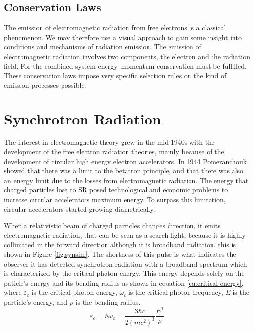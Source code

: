 \subsection{Conservation Laws}
The emission of electromagnetic radiation from free electrons is a classical phenomenon. We may therefore use a visual approach to gain some insight into conditions and mechanisms of radiation emission.
The emission of electromagnetic radiation involves two components, the electron and the radiation field. For the combined system energy–momentum conservation must be fulfilled. These conservation laws impose very specific selection rules on the kind of emission processes possible.
\section{Synchrotron Radiation}
The interest in electromagnetic theory grew in the mid 1940s with the development of the free electron radiation theories, mainly  because of the development of circular high energy electron accelerators. In 1944 Pomeranchouk showed that there was a limit to the betatron principle, and that there was also an energy limit due to the losses from electromagnetic radiation. The energy that charged particles lose to SR posed technological and economic problems to increase circular accelerators maximum energy. To surpass this limitation, circular accelerators started growing diametrically\citep{libro}.

When a relativistic beam of charged particles changes direction, it emits electromagnetic radiation, that can be seen as a search light, because it is highly collimated in the forward direction although it is broadband radiation, this is shown in Figure \ref{fig:synsim}. The shortness of this pulse is what indicates the observer it has detected synchrotron radiation with a broadband spectrum which is characterized by the critical photon energy. This energy depends solely on the paticle's energy and its bending radius as shown in equation \ref{eq:critical energy}, where $\varepsilon_{c}$ is the critical photon energy, $\omega_{c}$ is the critical photon frequency, $E$ is the particle's energy, and $\rho$ is the bending radius\citep{libro}. 
\begin{equation}
\label{eq:critical energy}
\varepsilon_{c} = \hbar\omega_{c} = \dfrac{3\hbar c}{2(mc^{2})^{3}}\dfrac{E^{3}}{\rho}
\end{equation}

